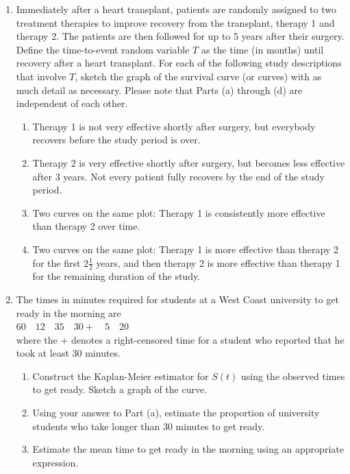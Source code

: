 \documentclass[
]{book}
\begin{document}
\begin{enumerate}
  \item Immediately after a heart transplant, patients are randomly assigned to two treatment therapies to improve recovery from the transplant, therapy 1 and therapy 2. The patients are then followed for up to 5 years after their surgery. Define the time-to-event random variable $T$ as the time (in months) until recovery after a heart transplant. For each of the following study descriptions that involve $T$, sketch the graph of the survival curve (or curves) with as much detail as necessary. Please note that Parts (a) through (d) are independent of each other.
  \begin{enumerate}
    \item Therapy 1 is not very effective shortly after surgery, but everybody recovers before the study period is over.
    \item Therapy 2 is very effective shortly after surgery, but becomes less effective after 3 years. Not every patient fully recovers by the end of the study period.
    \item Two curves on the same plot: Therapy 1 is consistently more effective than therapy 2 over time.
    \item Two curves on the same plot: Therapy 1 is more effective than therapy 2 for the first $2\frac{1}{2}$ years, and then therapy 2 is more effective than therapy 1 for the remaining duration of the study.
  \end{enumerate}

  \item The times in minutes required for students at a West Coast university to get ready in the morning are\\
  \hspace*{1em} $60 \quad 12 \quad 35 \quad 30+ \quad 5 \quad 20$\\
  where the $+$ denotes a right-censored time for a student who reported that he took at least 30 minutes.
  \begin{enumerate}
    \item Construct the Kaplan-Meier estimator for $S(t)$ using the observed times to get ready. Sketch a graph of the curve.
    \item Using your answer to Part (a), estimate the proportion of university students who take longer than 30 minutes to get ready.
    \item Estimate the mean time to get ready in the morning using an appropriate expression.
  \end{enumerate}


\end{enumerate}
\end{document}
